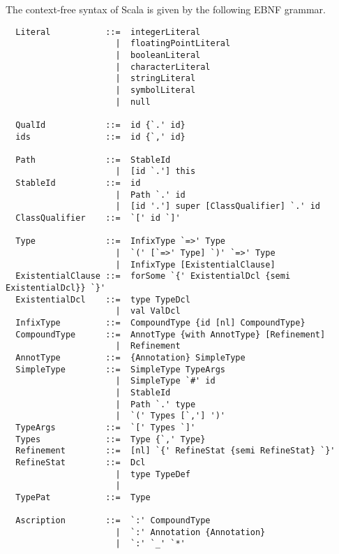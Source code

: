The context-free syntax of Scala is given by the following EBNF
grammar.

{\small
\begin{lstlisting}
  Literal           ::=  integerLiteral
                      |  floatingPointLiteral
                      |  booleanLiteral
                      |  characterLiteral
                      |  stringLiteral
                      |  symbolLiteral
                      |  null

  QualId            ::=  id {`.' id}
  ids               ::=  id {`,' id}

  Path              ::=  StableId
                      |  [id `.'] this
  StableId          ::=  id
                      |  Path `.' id
                      |  [id '.'] super [ClassQualifier] `.' id
  ClassQualifier    ::=  `[' id `]'

  Type              ::=  InfixType `=>' Type
                      |  `(' [`=>' Type] `)' `=>' Type
                      |  InfixType [ExistentialClause]
  ExistentialClause ::=  forSome `{' ExistentialDcl {semi ExistentialDcl}} `}'
  ExistentialDcl    ::=  type TypeDcl 
                      |  val ValDcl
  InfixType         ::=  CompoundType {id [nl] CompoundType}
  CompoundType      ::=  AnnotType {with AnnotType} [Refinement]
                      |  Refinement
  AnnotType         ::=  {Annotation} SimpleType
  SimpleType        ::=  SimpleType TypeArgs
                      |  SimpleType `#' id
                      |  StableId
                      |  Path `.' type
                      |  `(' Types [`,'] ')'
  TypeArgs          ::=  `[' Types `]'
  Types             ::=  Type {`,' Type}
  Refinement        ::=  [nl] `{' RefineStat {semi RefineStat} `}'
  RefineStat        ::=  Dcl
                      |  type TypeDef
                      |
  TypePat           ::=  Type

  Ascription        ::=  `:' CompoundType
                      |  `:' Annotation {Annotation} 
                      |  `:' `_' `*'


\end{lstlisting}}
